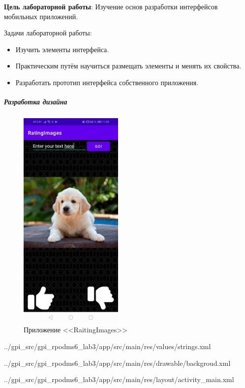 \documentclass[12pt, a4paper, simple]{eskdtext}
\begin{document}
    
    \textbf{Цель лабораторной работы}: Изучение основ разработки интерфейсов мобильных приложений.

    Задачи лабораторной работы:
    \begin{itemize}
        \item Изучить элементы интерфейса.
        \item Практическим путём научиться размещать элементы и менять их свойства.
        \item Разработать прототип интерфейса собственного приложения.
    \end{itemize}

    \subparagraph{Разработка дизайна} \hspace{0pt}

    \begin{figure}[!h]
        \centering
        \includegraphics[height=11cm]
            {_assets/gpi_RaitingImages.jpg}
        \caption{Приложение <<RaitingImages>>}
        \label{fig:gpi_hit}
    \end{figure}

    
        {../gpi_src/gpi_rpodms6_lab3/app/src/main/res/values/strings.xml}

    
        {../gpi_src/gpi_rpodms6_lab3/app/src/main/res/drawable/backgroud.xml}

    
        {../gpi_src/gpi_rpodms6_lab3/app/src/main/res/layout/activity_main.xml}
\end{document}
